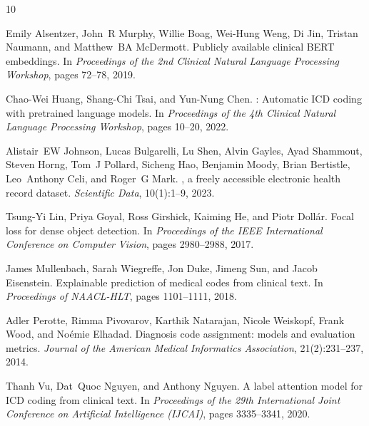 \documentclass[11pt,a4paper]{article}
\begin{document}


\begin{thebibliography}{10}

Emily Alsentzer, John~R Murphy, Willie Boag, Wei-Hung Weng, Di Jin, Tristan Naumann, and Matthew~BA McDermott.
\newblock Publicly available clinical {BERT} embeddings.
\newblock In \textit{Proceedings of the 2nd Clinical Natural Language Processing Workshop}, pages 72--78, 2019.

Chao-Wei Huang, Shang-Chi Tsai, and Yun-Nung Chen.
: Automatic {ICD} coding with pretrained language models.
\newblock In \textit{Proceedings of the 4th Clinical Natural Language Processing Workshop}, pages 10--20, 2022.

Alistair~EW Johnson, Lucas Bulgarelli, Lu Shen, Alvin Gayles, Ayad Shammout, Steven Horng, Tom~J Pollard, Sicheng Hao, Benjamin Moody, Brian Ber\-tistle, Leo~Anthony Celi, and Roger~G Mark.
, a freely accessible electronic health record dataset.
\newblock \textit{Scientific Data}, 10(1):1--9, 2023.

Tsung-Yi Lin, Priya Goyal, Ross Girshick, Kaiming He, and Piotr Doll{\'a}r.
\newblock Focal loss for dense object detection.
\newblock In \textit{Proceedings of the IEEE International Conference on Computer Vision}, pages 2980--2988, 2017.

James Mullenbach, Sarah Wiegreffe, Jon Duke, Jimeng Sun, and Jacob Eisenstein.
\newblock Explainable prediction of medical codes from clinical text.
\newblock In \textit{Proceedings of NAACL-HLT}, pages 1101--1111, 2018.

Adler Perotte, Rimma Pivovarov, Karthik Natarajan, Nicole Weiskopf, Frank Wood, and No{\'e}mie Elhadad.
\newblock Diagnosis code assignment: models and evaluation metrics.
\newblock \textit{Journal of the American Medical Informatics Association}, 21(2):231--237, 2014.

Thanh Vu, Dat~Quoc Nguyen, and Anthony Nguyen.
\newblock A label attention model for {ICD} coding from clinical text.
\newblock In \textit{Proceedings of the 29th International Joint Conference on Artificial Intelligence (IJCAI)}, pages 3335--3341, 2020.

\end{thebibliography}
\end{document}
